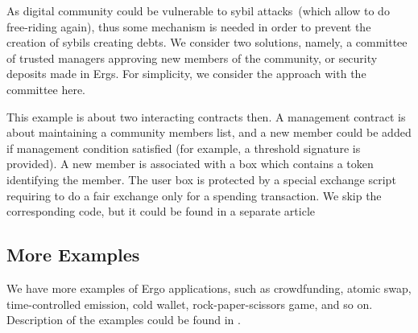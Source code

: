  As digital community could be vulnerable to sybil attacks~(which allow to do free-riding again), thus some mechanism
 is needed in order to prevent the creation of sybils creating debts. We consider two solutions, namely, a committee of
 trusted managers approving new members of the community, or security deposits made in Ergs. For simplicity, we
 consider the approach with the committee here.

 This example is about two interacting contracts then. A management contract is about maintaining a
 community members list, and a new member could be added if management condition satisfied  (for example, a threshold
 signature is provided). A new member is associated with a box which contains a token identifying the member. The user
 box is protected by a special exchange script requiring to do a fair exchange only for a spending transaction.
 We skip the corresponding code, but it could be found in a separate article 

\subsection{More Examples}


 We have more examples of Ergo applications, such as crowdfunding, atomic swap, time-controlled emission,
 cold wallet, rock-paper-scissors game, and so on. Description of the examples could be found in \cite{ergoTutorial,
 ergoAdvTutorial}.
